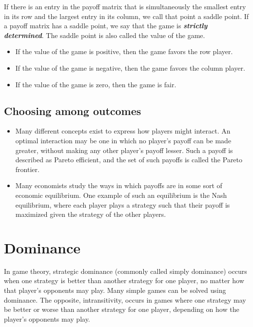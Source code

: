 \documentclass[]{report}
\begin{document}
\begin{framed}
If there is an entry in the payoff matrix that is simultaneously the smallest entry in its row and
the largest entry in its column, we call that point a saddle point. If a payoff matrix has a saddle point, we say that the game is \textbf{\textit{strictly determined}}. The saddle point is also called the value of the game.
\begin{itemize}
\item If the value of the game is positive, then the game favors the row player.
\item If the value of the game is negative, then the game favors the column player.
\item If the value of the game is zero, then the game is fair.
\end{itemize}
\end{framed}




\subsection{Choosing among outcomes}
\begin{itemize}
\item Many different concepts exist to express how players might interact. An optimal interaction may be one in which no player's payoff can be made greater, without making any other player's payoff lesser. Such a payoff is described as Pareto efficient, and the set of such payoffs is called the Pareto frontier.
\item 
Many economists study the ways in which payoffs are in some sort of economic equilibrium. One example of such an equilibrium is the Nash equilibrium, where each player plays a strategy such that their payoff is maximized given the strategy of the other players.
\end{itemize}

\section{Dominance}
In game theory, strategic dominance (commonly called simply dominance) occurs when one strategy is better than another strategy for one player, no matter how that player's opponents may play. Many simple games can be solved using dominance. The opposite, intransitivity, occurs in games where one strategy may be better or worse than another strategy for one player, depending on how the player's opponents may play.
\end{document}
